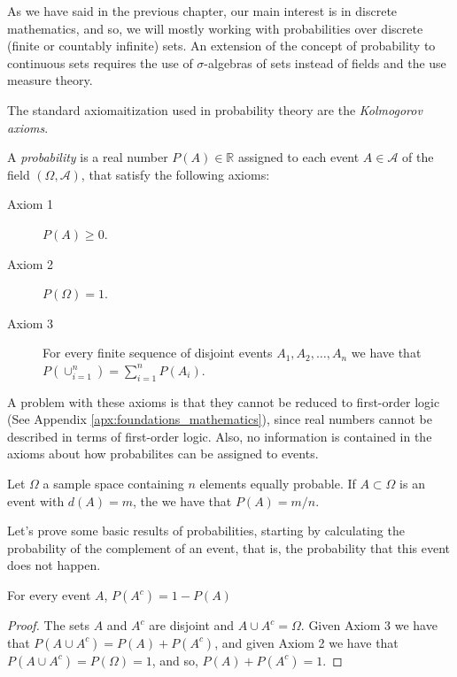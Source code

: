 As we have said in the previous chapter, our main interest is in discrete mathematics, and so, we will mostly working with probabilities over discrete (finite or countably infinite) sets. An extension of the concept of probability to continuous sets requires the use of $\sigma$-algebras of sets instead of fields and the use measure theory.

The standard axiomaitization used in probability theory are the \emph{Kolmogorov axioms}.

\begin{definition}
A \emph{probability} is a real number $P(A) \in \mathbb{R}$ assigned to each event $A \in \mathcal{A}$ of the field $\left( \Omega, \mathcal{A} \right)$, that satisfy the following axioms:

\medskip

\begin{description}
\item [Axiom 1] $P(A) \geq 0$.
\item [Axiom 2] $P(\Omega) = 1$.
\item [Axiom 3] For every finite sequence of disjoint events $A_1, A_2, \ldots, A_n$ we have that $P(\cup_{i=1}^n) = \sum_{i=1}^n P(A_i)$.
\end{description}
\end{definition}

A problem with these axioms is that they cannot be reduced to first-order logic (See Appendix \ref{apx:foundations_mathematics}), since real numbers cannot be described in terms of first-order logic. Also, no information is contained in the axioms about how probabilites can be assigned to events.

\begin{example}
Let $\Omega$ a sample space containing $n$ elements equally probable. If $A \subset \Omega$ is an event with $d(A) = m$, the we have that $P(A) = m/n$.
\end{example}

Let's prove some basic results of probabilities, starting by calculating the probability of the complement of an event, that is, the probability that this event does not happen.

\begin{proposition}
For every event $A$, $P \left( A^{c} \right) = 1 - P \left( A \right)$
\end{proposition}
\begin{proof}
The sets $A$ and $A^c$ are disjoint and $A \cup A^c = \Omega$. Given Axiom 3 we have that $P \left( A \cup A^c \right) = P \left( A \right) + P \left( A^c \right)$, and given Axiom 2 we have that $P \left( A \cup A^c \right) = P(\Omega) = 1$, and so, $P \left( A \right) + P \left( A^c \right) = 1$.
\end{proof}


